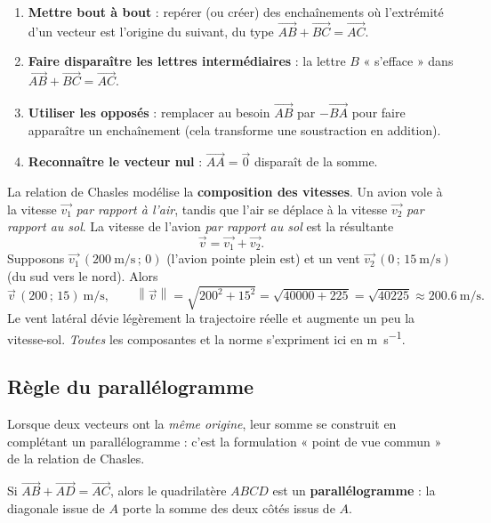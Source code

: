 \documentclass[11pt,a4paper]{article}
\newcommand{\vc}[1]{\overrightarrow{#1}}        %
\providecommand{\norm}[1]{\left\lVert #1\right\rVert}
\begin{document}
\begin{methode}
\begin{enumerate}[leftmargin=1.8em,topsep=2pt,itemsep=2pt]
  \item \textbf{Mettre bout à bout} : repérer (ou créer) des enchaînements où l'extrémité d'un vecteur
        est l'origine du suivant, du type $\vc{AB}+\vc{BC}=\vc{AC}$.
  \item \textbf{Faire disparaître les lettres intermédiaires} : la lettre $B$ « s'efface » dans
        $\vc{AB}+\vc{BC}=\vc{AC}$.
  \item \textbf{Utiliser les opposés} : remplacer au besoin $\vc{AB}$ par $-\vc{BA}$ pour faire apparaître
        un enchaînement (cela transforme une soustraction en addition).
  \item \textbf{Reconnaître le vecteur nul} : $\vc{AA}=\vec{0}$ disparaît de la somme.
\end{enumerate}
\end{methode}

\begin{exemple}
La relation de Chasles modélise la \textbf{composition des vitesses}. Un avion vole à la vitesse
$\vec{v_1}$ \emph{par rapport à l'air}, tandis que l'air se déplace à la vitesse $\vec{v_2}$
\emph{par rapport au sol}. La vitesse de l'avion \emph{par rapport au sol} est la résultante
\[
  \vec{v}=\vec{v_1}+\vec{v_2}.
\]
Supposons $\vec{v_1}\,(\qty{200}{\m\per\s}\,;\,0)$ (l'avion pointe plein est) et un vent
$\vec{v_2}\,(0\,;\,\qty{15}{\m\per\s})$ (du sud vers le nord). Alors
\[
  \vec{v}\,(200\,;\,15)\ \unit{\m\per\s},\qquad
  \norm{\vec{v}}=\sqrt{200^2+15^2}=\sqrt{40000+225}=\sqrt{40225}\approx \qty{200.6}{\m\per\s}.
\]
Le vent latéral dévie légèrement la trajectoire réelle et augmente un peu la vitesse-sol. \emph{Toutes}
les composantes et la norme s'expriment ici en \unit{\m\per\s}.
\end{exemple}

\subsection{Règle du parallélogramme}

Lorsque deux vecteurs ont la \emph{même origine}, leur somme se construit en complétant un
parallélogramme : c'est la formulation « point de vue commun » de la relation de Chasles.

\begin{theoreme}
Si $\vc{AB}+\vc{AD}=\vc{AC}$, alors le quadrilatère $ABCD$ est un \textbf{parallélogramme} : la diagonale
issue de $A$ porte la somme des deux côtés issus de $A$.
\end{theoreme}
\end{document}
